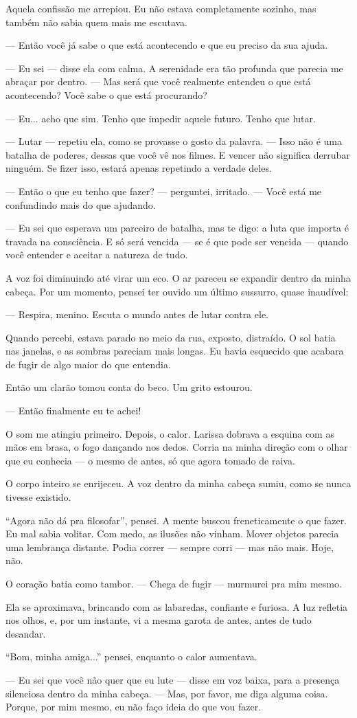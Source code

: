 Aquela confissão me arrepiou. Eu não estava completamente sozinho, mas também não sabia quem mais me escutava.

— Então você já sabe o que está acontecendo e que eu preciso da sua ajuda.

— Eu sei — disse ela com calma. A serenidade era tão profunda que parecia me abraçar por dentro.  
— Mas será que você realmente entendeu o que está acontecendo? Você sabe o que está procurando?

— Eu... acho que sim. Tenho que impedir aquele futuro. Tenho que lutar.

— Lutar — repetiu ela, como se provasse o gosto da palavra. — Isso não é uma batalha de poderes, dessas que você vê nos filmes. E vencer não significa derrubar ninguém. Se fizer isso, estará apenas repetindo a verdade deles.

— Então o que eu tenho que fazer? — perguntei, irritado. — Você está me confundindo mais do que ajudando.

— Eu sei que esperava um parceiro de batalha, mas te digo: a luta que importa é travada na consciência. E só será vencida — se é que pode ser vencida — quando você entender e aceitar a natureza de tudo.

A voz foi diminuindo até virar um eco. O ar pareceu se expandir dentro da minha cabeça.  
Por um momento, pensei ter ouvido um último sussurro, quase inaudível:

— Respira, menino. Escuta o mundo antes de lutar contra ele.

Quando percebi, estava parado no meio da rua, exposto, distraído. O sol batia nas janelas, e as sombras pareciam mais longas. Eu havia esquecido que acabara de fugir de algo maior do que entendia.

Então um clarão tomou conta do beco. Um grito estourou.

— Então finalmente eu te achei!

O som me atingiu primeiro. Depois, o calor.  
Larissa dobrava a esquina com as mãos em brasa, o fogo dançando nos dedos. Corria na minha direção com o olhar que eu conhecia — o mesmo de antes, só que agora tomado de raiva.

O corpo inteiro se enrijeceu.  
A voz dentro da minha cabeça sumiu, como se nunca tivesse existido.

“Agora não dá pra filosofar”, pensei.  
A mente buscou freneticamente o que fazer.  
Eu mal sabia volitar. Com medo, as ilusões não vinham. Mover objetos parecia uma lembrança distante.  
Podia correr — sempre corri — mas não mais.  
Hoje, não.

O coração batia como tambor.  
— Chega de fugir — murmurei pra mim mesmo.

Ela se aproximava, brincando com as labaredas, confiante e furiosa. A luz refletia nos olhos, e, por um instante, vi a mesma garota de antes, antes de tudo desandar.

“Bom, minha amiga...” pensei, enquanto o calor aumentava.

— Eu sei que você não quer que eu lute — disse em voz baixa, para a presença silenciosa dentro da minha cabeça. — Mas, por favor, me diga alguma coisa. Porque, por mim mesmo, eu não faço ideia do que vou fazer.
